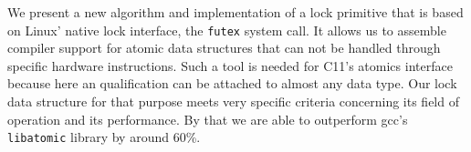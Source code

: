 We present a new algorithm and implementation of a lock primitive that
is based on Linux' native lock interface, the \texttt{futex} system
call. It allows us to assemble compiler support for atomic data
structures that can not be handled through specific hardware
instructions.  Such a tool is needed for C11's atomics
interface because here an  qualification can be attached
to almost any data type. Our lock data structure for that purpose
meets very specific criteria concerning its field of operation and its
performance. By that we are able to outperform gcc's
\texttt{libatomic} library by around 60\%.

